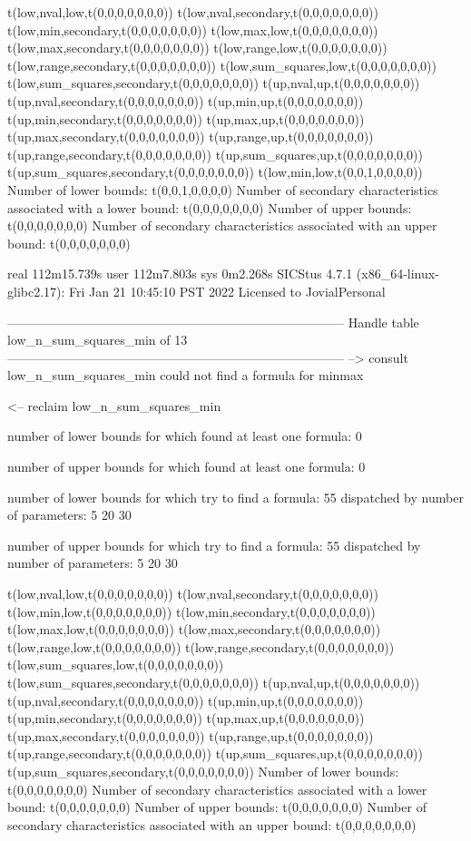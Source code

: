 t(low,nval,low,t(0,0,0,0,0,0,0))
t(low,nval,secondary,t(0,0,0,0,0,0,0))
t(low,min,secondary,t(0,0,0,0,0,0,0))
t(low,max,low,t(0,0,0,0,0,0,0))
t(low,max,secondary,t(0,0,0,0,0,0,0))
t(low,range,low,t(0,0,0,0,0,0,0))
t(low,range,secondary,t(0,0,0,0,0,0,0))
t(low,sum_squares,low,t(0,0,0,0,0,0,0))
t(low,sum_squares,secondary,t(0,0,0,0,0,0,0))
t(up,nval,up,t(0,0,0,0,0,0,0))
t(up,nval,secondary,t(0,0,0,0,0,0,0))
t(up,min,up,t(0,0,0,0,0,0,0))
t(up,min,secondary,t(0,0,0,0,0,0,0))
t(up,max,up,t(0,0,0,0,0,0,0))
t(up,max,secondary,t(0,0,0,0,0,0,0))
t(up,range,up,t(0,0,0,0,0,0,0))
t(up,range,secondary,t(0,0,0,0,0,0,0))
t(up,sum_squares,up,t(0,0,0,0,0,0,0))
t(up,sum_squares,secondary,t(0,0,0,0,0,0,0))
t(low,min,low,t(0,0,1,0,0,0,0))
Number of lower bounds:                                             t(0,0,1,0,0,0,0)
Number of secondary characteristics associated with a lower bound:  t(0,0,0,0,0,0,0)
Number of upper bounds:                                             t(0,0,0,0,0,0,0)
Number of secondary characteristics associated with an upper bound: t(0,0,0,0,0,0,0)

real	112m15.739s
user	112m7.803s
sys	0m2.268s
SICStus 4.7.1 (x86_64-linux-glibc2.17): Fri Jan 21 10:45:10 PST 2022
Licensed to JovialPersonal


--------------------------------------------------------------------------------
Handle table low_n_sum_squares_min of 13
--------------------------------------------------------------------------------
--> consult low_n_sum_squares_min
could not find a formula for minmax

<-- reclaim low_n_sum_squares_min

number of lower bounds for which found at least one formula: 0

number of upper bounds for which found at least one formula: 0

number of lower bounds for which try to find a formula: 55
dispatched by number of parameters: 5  20  30

number of upper bounds for which try to find a formula: 55
dispatched by number of parameters: 5  20  30

t(low,nval,low,t(0,0,0,0,0,0,0))
t(low,nval,secondary,t(0,0,0,0,0,0,0))
t(low,min,low,t(0,0,0,0,0,0,0))
t(low,min,secondary,t(0,0,0,0,0,0,0))
t(low,max,low,t(0,0,0,0,0,0,0))
t(low,max,secondary,t(0,0,0,0,0,0,0))
t(low,range,low,t(0,0,0,0,0,0,0))
t(low,range,secondary,t(0,0,0,0,0,0,0))
t(low,sum_squares,low,t(0,0,0,0,0,0,0))
t(low,sum_squares,secondary,t(0,0,0,0,0,0,0))
t(up,nval,up,t(0,0,0,0,0,0,0))
t(up,nval,secondary,t(0,0,0,0,0,0,0))
t(up,min,up,t(0,0,0,0,0,0,0))
t(up,min,secondary,t(0,0,0,0,0,0,0))
t(up,max,up,t(0,0,0,0,0,0,0))
t(up,max,secondary,t(0,0,0,0,0,0,0))
t(up,range,up,t(0,0,0,0,0,0,0))
t(up,range,secondary,t(0,0,0,0,0,0,0))
t(up,sum_squares,up,t(0,0,0,0,0,0,0))
t(up,sum_squares,secondary,t(0,0,0,0,0,0,0))
Number of lower bounds:                                             t(0,0,0,0,0,0,0)
Number of secondary characteristics associated with a lower bound:  t(0,0,0,0,0,0,0)
Number of upper bounds:                                             t(0,0,0,0,0,0,0)
Number of secondary characteristics associated with an upper bound: t(0,0,0,0,0,0,0)

